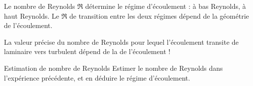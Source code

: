 \documentclass[12pt,fancy]{cours}
\begin{document}
\begin{prop}\label{prop:}
	Le nombre de Reynolds  $\Re$ détermine le régime d'écoulement :  à bas Reynolds,  à haut Reynolds. Le $\Re$ de transition entre les deux régimes dépend de la géométrie de l'écoulement.
\end{prop}

\begin{remarque}
	La valeur précise du nombre de Reynolds pour lequel l'écoulement transite de laminaire vers turbulent dépend de la  de l'écoulement ! 
\end{remarque}

\begin{exemple}{Estimation de nombre de Reynolds}
	Estimer le nombre de Reynolds dans l'expérience précédente, et en déduire le régime d'écoulement.
\end{exemple}
\examplesol{}

\end{document}
